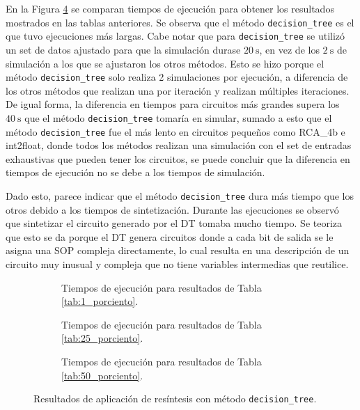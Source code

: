 En la Figura \ref{fig:comparacion_tiempos} se comparan
tiempos de ejecución para obtener los resultados mostrados en las tablas
anteriores. Se observa que el método \texttt{decision\_tree} es el que tuvo
ejecuciones más largas. Cabe notar que para \texttt{decision\_tree} se utilizó
un set de datos ajustado para que la simulación durase $\SI{20}{\second}$, en
vez de los $\SI{2}{\second}$ de simulación a los que se ajustaron los otros
métodos. Esto se hizo porque el método \texttt{decision\_tree} solo realiza 2
simulaciones por ejecución, a diferencia de los otros métodos que realizan una
por iteración y realizan múltiples iteraciones. De igual forma, la diferencia
en tiempos para circuitos más grandes supera los $\SI{40}{\second}$ que el
método \texttt{decision\_tree} tomaría en simular, sumado a esto que el método
\texttt{decision\_tree} fue el más lento en circuitos pequeños como RCA\_4b e
int2float, donde todos los métodos realizan una simulación con el set de
entradas exhaustivas que pueden tener los circuitos, se puede concluir que la
diferencia en tiempos de ejecución no se debe a los tiempos de simulación.

Dado esto, parece indicar que el método \texttt{decision\_tree} dura más tiempo
que los otros debido a los tiempos de sintetización. Durante las ejecuciones se
observó que sintetizar el circuito generado por el DT tomaba mucho tiempo. Se
teoriza que esto se da porque el DT genera circuitos donde a cada bit de salida
se le asigna una SOP compleja directamente, lo cual resulta en una descripción
de un circuito muy inusual y compleja que no tiene variables intermedias que
reutilice.

\begin{figure}
  \centering
  \begin{subfigure}{0.75\textwidth}
    \centering
    
    \caption{Tiempos de ejecución para resultados de Tabla \ref{tab:1_porciento}.}
    \label{fig:01_tiempo}
  \end{subfigure}
  \begin{subfigure}{0.75\textwidth}
    \centering
    
    \caption{Tiempos de ejecución para resultados de Tabla \ref{tab:25_porciento}.}
    \label{fig:25_tiempo}
  \end{subfigure}
  \begin{subfigure}{0.75\textwidth}
    \centering
    
    \caption{Tiempos de ejecución para resultados de Tabla \ref{tab:50_porciento}.}
    \label{fig:50_tiempo}
  \end{subfigure}
  \caption{Resultados de aplicación de resíntesis con método \texttt{decision\_tree}.}
  \label{fig:comparacion_tiempos}
\end{figure}

